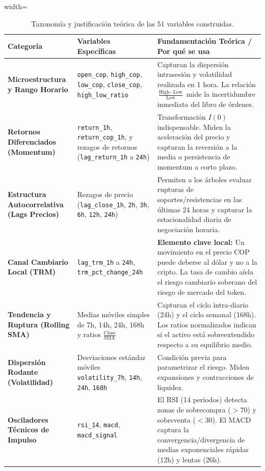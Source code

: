 \documentclass[12pt,letterpaper]{article}
\begin{document}
\begin{table}[H]
\centering
\caption{Taxonomía y justificación teórica de las 51 variables construidas.}
\label{tab:features_taxonomy}
\begin{adjustbox}{width=\textwidth}
\begin{tabular}{lp{6cm}p{7cm}}
\toprule
\textbf{Categoría} & \textbf{Variables Específicas} & \textbf{Fundamentación Teórica / Por qué se usa} \\
\midrule
\textbf{Microestructura y Rango Horario} & \texttt{open\_cop}, \texttt{high\_cop}, \texttt{low\_cop}, \texttt{close\_cop}, \texttt{high\_low\_ratio} & Capturan la dispersión intrasesión y volatilidad realizada en 1 hora. La relación $\frac{\text{High}-\text{Low}}{\text{Low}}$ mide la incertidumbre inmediata del libro de órdenes. \\
\midrule
\textbf{Retornos Diferenciados (Momentum)} & \texttt{return\_1h}, \texttt{return\_cop\_1h}, y rezagos de retornos (\texttt{lag\_return\_1h} a \texttt{24h}) & Transformación $I(0)$ indispensable. Miden la aceleración del precio y capturan la reversión a la media o persistencia de momentum a corto plazo. \\
\midrule
\textbf{Estructura Autocorrelativa (Lags Precios)} & Rezagos de precio (\texttt{lag\_close\_1h}, \texttt{2h}, \texttt{3h}, \texttt{6h}, \texttt{12h}, \texttt{24h}) & Permiten a los árboles evaluar rupturas de soportes/resistencias en las últimas 24 horas y capturar la estacionalidad diaria de negociación horaria. \\
\midrule
\textbf{Canal Cambiario Local (TRM)} & \texttt{lag\_trm\_1h} a \texttt{24h}, \texttt{trm\_pct\_change\_24h} & \textbf{Elemento clave local:} Un movimiento en el precio COP puede deberse al dólar y no a la cripto. La tasa de cambio aísla el riesgo cambiario soberano del riesgo de mercado del token. \\
\midrule
\textbf{Tendencia y Ruptura (Rolling SMA)} & Medias móviles simples de 7h, 14h, 24h, 168h y ratios $\frac{\text{Close}}{\text{SMA}}$ & Capturan el ciclo intra-diario (24h) y el ciclo semanal (168h). Los ratios normalizados indican si el activo está sobreextendido respecto a su equilibrio medio. \\
\midrule
\textbf{Dispersión Rodante (Volatilidad)} & Desviaciones estándar móviles \texttt{volatility\_7h}, \texttt{14h}, \texttt{24h}, \texttt{168h} & Condición previa para parametrizar el riesgo. Miden expansiones y contracciones de liquidez. \\
\midrule
\textbf{Osciladores Técnicos de Impulso} & \texttt{rsi\_14}, \texttt{macd}, \texttt{macd\_signal} & El RSI (14 periodos) detecta zonas de sobrecompra ($>70$) y sobreventa ($<30$). El MACD captura la convergencia/divergencia de medias exponenciales rápidas (12h) y lentas (26h). \\
\bottomrule
\end{tabular}
\end{adjustbox}
\end{table}
\end{document}
